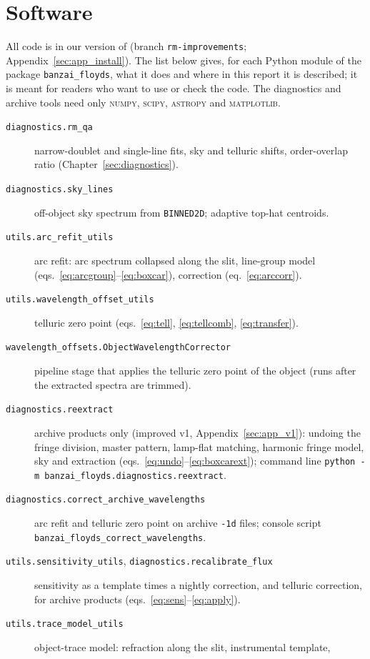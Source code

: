 \chapter{Software}
\label{sec:software}

All code is in our version of \banzai{} (branch \texttt{rm-improvements}; Appendix~\ref{sec:app_install}). The
list below gives, for each Python module of the package \texttt{banzai\_floyds}, what it does and where in this report
it is described; it is meant for readers who want to use or check the code. The diagnostics and archive tools need
only \textsc{numpy}, \textsc{scipy}, \textsc{astropy} and \textsc{matplotlib}.

\begin{description}
\item[\texttt{diagnostics.rm\_qa}] narrow-doublet and single-line fits, sky and telluric shifts, order-overlap ratio
(Chapter~\ref{sec:diagnostics}).
\item[\texttt{diagnostics.sky\_lines}] off-object sky spectrum from \texttt{BINNED2D}; adaptive top-hat centroids.
\item[\texttt{utils.arc\_refit\_utils}] arc refit: arc spectrum collapsed along the slit, line-group model (eqs.~\ref{eq:arcgroup}--\ref{eq:boxcar}),
correction (eq.~\ref{eq:arccorr}).
\item[\texttt{utils.wavelength\_offset\_utils}] telluric zero point (eqs.~\ref{eq:tell}, \ref{eq:tellcomb},
\ref{eq:transfer}).
\item[\texttt{wavelength\_offsets.ObjectWavelengthCorrector}] pipeline stage that applies the telluric zero point
of the object (runs after the extracted spectra are trimmed).
\item[\texttt{diagnostics.reextract}] archive products only (improved v1, Appendix~\ref{sec:app_v1}): undoing the
fringe division, master pattern, lamp-flat matching, harmonic fringe model, sky and extraction (eqs.~\ref{eq:undo}--\ref{eq:boxcarext});
command line \texttt{python -m banzai\_floyds.diagnostics.reextract}.
\item[\texttt{diagnostics.correct\_archive\_wavelengths}] arc refit and telluric zero point on archive
\texttt{-1d} files; console script \texttt{banzai\_floyds\_correct\_wavelengths}.
\item[\texttt{utils.sensitivity\_utils}, \texttt{diagnostics.recalibrate\_flux}] sensitivity as a template times a
nightly correction, and telluric correction, for archive products (eqs.~\ref{eq:sens}--\ref{eq:apply}).
\item[\texttt{utils.trace\_model\_utils}] object-trace model: refraction along the slit, instrumental template,

\end{description}
